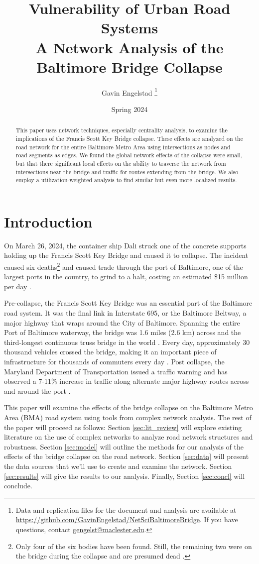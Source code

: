 \documentclass[11pt]{article}
\title{Vulnerability of Urban Road Systems \\ %
    \large A Network Analysis of the Baltimore Bridge Collapse}
\author{Gavin Engelstad \thanks{Data and replication files for the document and analysis are available at \url{https://github.com/GavinEngelstad/NetSciBaltimoreBridge}. If you have questions, contact \href{mailto:gengelst@macalester.edu}{gengelst@maclester.edu}.}}
\date{Spring 2024}
\numberwithin{equation}{section} %
\numberwithin{figure}{section} %
\numberwithin{table}{section} %
\theoremstyle{definition}
\begin{document}
\maketitle

\begin{abstract}
  This paper uses network techniques, especially centrality analysis, to examine the implications of the Francis Scott Key Bridge collapse. These effects are analyzed on the road network for the entire Baltimore Metro Area using intersections as nodes and road segments as edges. We found the global network effects of the collapse were small, but that there significant local effects on the ability to traverse the network from intersections near the bridge and traffic for routes extending from the bridge. We also employ a utilization-weighted analysis to find similar but even more localized results.
\end{abstract}

\section{Introduction}

On March 26, 2024, the container ship Dali struck one of the concrete supports holding up the Francis Scott Key Bridge and caused it to collapse. The incident caused six deaths\footnote{Only four of the six bodies have been found. Still, the remaining two were on the bridge during the collapse and are presumed dead \parencite{Hassan24}.} and caused trade through the port of Baltimore, one of the largest ports in the country, to grind to a halt, costing an estimated \$15 million per day \parencites{Hassan24}{AlJazeera24}.

Pre-collapse, the Francis Scott Key Bridge was an essential part of the Baltimore road system. It was the final link in Interstate 695, or the Baltimore Beltway, a major highway that wraps around the City of Baltimore. Spanning the entire Port of Baltimore waterway, the bridge was 1.6 miles (2.6 km) across and the third-longest continuous truss bridge in the world \parencite{Parry24}. Every day, approximately 30 thousand vehicles crossed the bridge, making it an important piece of infrastructure for thousands of commuters every day \parencite{MDOT24}. Post collapse, the Maryland Department of Transportation issued a traffic warning and has observed a 7-11\% increase in traffic along alternate major highway routes across and around the port \parencites{MDOT24}{Domen24}.

This paper will examine the effects of the bridge collapse on the Baltimore Metro Area (BMA) road system using tools from complex network analysis. The rest of the paper will proceed as follows: Section \ref{sec:lit_review} will explore existing literature on the use of complex networks to analyze road network structures and robustness. Section \ref{sec:model} will outline the methods for our analysis of the effects of the bridge collapse on the road network. Section \ref{sec:data} will present the data sources that we'll use to create and examine the network. Section \ref{sec:results} will give the results to our analysis. Finally, Section \ref{sec:concl} will conclude.
\end{document}
